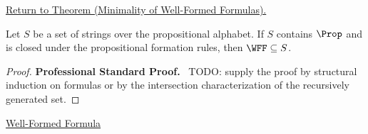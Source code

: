 \newpage
{}
\label{prf:minimality-of-well-formed-formulas}

\begin{remark*}[Return]
\hyperref[thm:minimality-of-well-formed-formulas]{Return to Theorem (Minimality of Well-Formed Formulas).}
\end{remark*}

\begin{theorem*}
Let \(S\) be a set of strings over the propositional alphabet. If \(S\)
contains \(\Prop\) and is closed under the propositional formation rules, then
\(\WFF\subseteq S\).
\end{theorem*}

\begin{proof}
\textbf{Professional Standard Proof.}~
TODO: supply the proof by structural induction on formulas or by the
intersection characterization of the recursively generated set.
\end{proof}

\begin{dependencies}
\hyperref[def:well-formed-formula]{Well-Formed Formula}
\end{dependencies}

\clearpage
